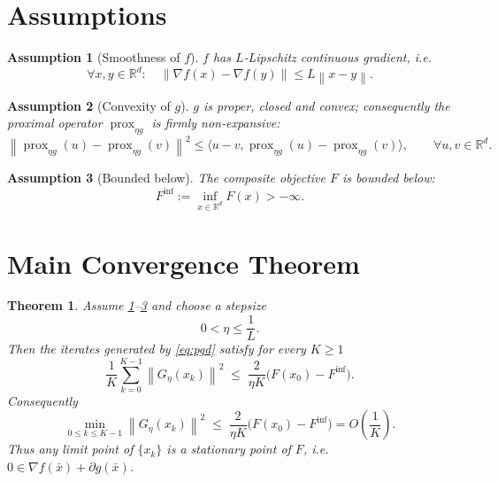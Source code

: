 \documentclass{article}
\newtheorem{assumption}{Assumption}
\newtheorem{theorem}{Theorem}
\newcommand{\prox}{\operatorname{prox}}
\newcommand{\grad}{\nabla}
\newcommand{\R}{\mathbb{R}}
\newcommand{\norm}[1]{\left\|#1\right\|}
\begin{document}
\newpage

\section*{Assumptions}
\begin{assumption}[Smoothness of $f$]\label{as:smooth}
$f$ has $L$‑Lipschitz continuous gradient, i.e.
\[
\forall x,y\in\R^{d}:\quad
\norm{\grad f(x)-\grad f(y)}\le L\norm{x-y}.
\tag{2}
\]
\end{assumption}
\begin{assumption}[Convexity of $g$]\label{as:convex}
$g$ is proper, closed and convex; consequently the proximal operator $\prox_{\eta g}$ is \emph{firmly non‑expansive}:
\[
\norm{\prox_{\eta g}(u)-\prox_{\eta g}(v)}^{2}
\le \langle u-v,\prox_{\eta g}(u)-\prox_{\eta g}(v)\rangle,
\qquad\forall u,v\in\R^{d}.
\tag{3}
\]
\end{assumption}
\begin{assumption}[Bounded below]\label{as:bounded}
The composite objective $F$ is bounded below:
\[
F^{\inf}:=\inf_{x\in\R^{d}}F(x)>-\infty .
\tag{4}
\]
\end{assumption}

\section*{Main Convergence Theorem}
\begin{theorem}\label{thm:main}
Assume \ref{as:smooth}–\ref{as:bounded} and choose a stepsize
\[
0<\eta\le\frac{1}{L}.
\tag{5}
\]
Then the iterates generated by \eqref{eq:pgd} satisfy for every $K\ge1$
\[
\frac{1}{K}\sum_{k=0}^{K-1}\norm{G_{\eta}(x_{k})}^{2}
\;\le\;
\frac{2}{\eta K}\bigl(F(x_{0})-F^{\inf}\bigr).
\tag{6}
\]
Consequently
\[
\min_{0\le k\le K-1}\norm{G_{\eta}(x_{k})}^{2}
\;\le\;
\frac{2}{\eta K}\bigl(F(x_{0})-F^{\inf}\bigr)
=O\!\left(\frac{1}{K}\right).
\]
Thus any limit point of $\{x_{k}\}$ is a \emph{stationary point} of $F$, i.e.
$0\in\grad f(\bar x)+\partial g(\bar x)$.
\end{theorem}
\end{document}
